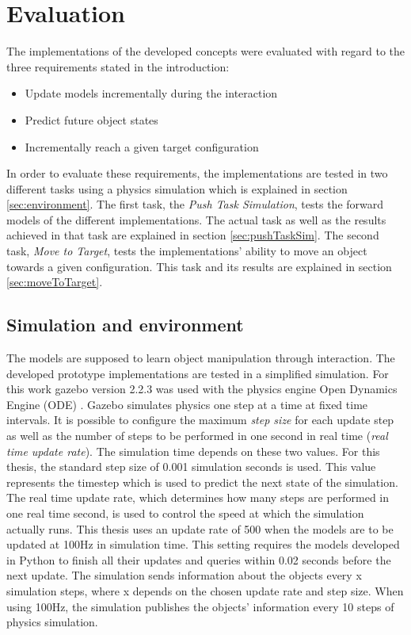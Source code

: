 \chapter{Evaluation\label{chap:evaluation}}



The implementations of the developed concepts were evaluated with regard to the three requirements stated in the introduction: 

\begin{itemize}
\item Update models incrementally during the interaction
\item Predict future object states
\item Incrementally reach a given target configuration
\end{itemize}

In order to evaluate these requirements, the implementations are tested in two different tasks using a physics simulation which is explained in section \ref{sec:environment}. The first task, the \textit{Push Task Simulation}, tests the forward models of the different implementations. The actual task as well as the results achieved in that task are explained in section \ref{sec:pushTaskSim}.
The second task, \textit{Move to Target}, tests the implementations' ability to move an object towards a given configuration. This task and its results are explained in section \ref{sec:moveToTarget}.

\section{Simulation and environment \label{sec:environment}} 

The models are supposed to learn object manipulation through interaction.
The developed prototype implementations are tested in a simplified simulation. For this work gazebo \cite{gazebo} version 2.2.3 was used with the physics engine Open Dynamics Engine (ODE) \cite{ode}.
Gazebo simulates physics one step at a time at fixed time intervals. It is possible to configure the maximum \textit{step size} for each update step as well as the number of steps to be performed in one second in real time (\textit{real time update rate}). 
The simulation time depends on these two values. For this thesis, the standard step size of 0.001 simulation seconds is used. This value represents the timestep which is used to predict the next state of the simulation. 
The real time update rate, which determines how many steps are performed in one real time second, is used to control the speed at which the simulation actually runs. 
This thesis uses an update rate of 500 when the models are to be updated at 100Hz in simulation time. This setting requires the models developed in Python to finish all their updates and queries within 0.02 seconds before the next update.
The simulation sends information about the objects every x simulation steps, where x depends on the chosen update rate and step size. When using 100Hz, the simulation publishes the objects' information every 10 steps of physics simulation.

